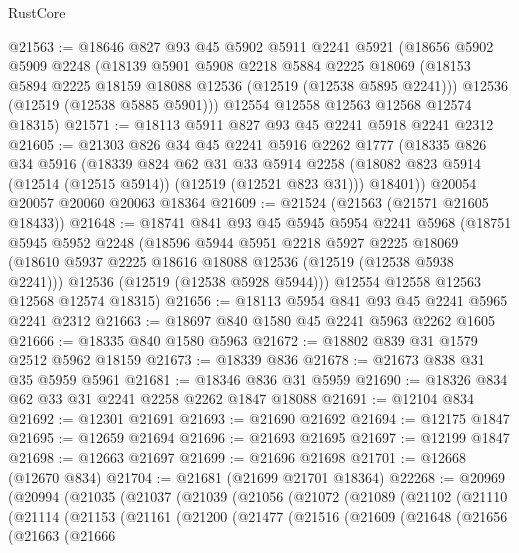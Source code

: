 \begin{lexlean}{RustCore}
\begin{coremodule}
@21563 := @18646
    @827
    @93
    @45
    @5902
    @5911
    @2241
    @5921
    (@18656
      @5902
      @5909
      @2248
      (@18139
        @5901
        @5908
        @2218
        @5884
        @2225
        @18069
        (@18153 @5894 @2225 @18159 @18088 @12536 (@12519 (@12538 @5895 @2241)))
        @12536
        (@12519 (@12538 @5885 @5901)))
      @12554
      @12558
      @12563
      @12568
      @12574
      @18315)
@21571 := @18113 @5911 @827 @93 @45 @2241 @5918 @2241 @2312
@21605 := @21303
    @826
    @34
    @45
    @2241
    @5916
    @2262
    @1777
    (@18335
      @826
      @34
      @5916
      (@18339
        @824
        @62
        @31
        @33
        @5914
        @2258
        (@18082 @823 @5914 (@12514 (@12515 @5914)) (@12519 (@12521 @823 @31)))
        @18401))
    @20054
    @20057
    @20060
    @20063
    @18364
@21609 := @21524 (@21563 (@21571 @21605 @18433))
@21648 := @18741
    @841
    @93
    @45
    @5945
    @5954
    @2241
    @5968
    (@18751
      @5945
      @5952
      @2248
      (@18596
        @5944
        @5951
        @2218
        @5927
        @2225
        @18069
        (@18610 @5937 @2225 @18616 @18088 @12536 (@12519 (@12538 @5938 @2241)))
        @12536
        (@12519 (@12538 @5928 @5944)))
      @12554
      @12558
      @12563
      @12568
      @12574
      @18315)
@21656 := @18113 @5954 @841 @93 @45 @2241 @5965 @2241 @2312
@21663 := @18697 @840 @1580 @45 @2241 @5963 @2262 @1605
@21666 := @18335 @840 @1580 @5963
@21672 := @18802 @839 @31 @1579 @2512 @5962 @18159
@21673 := @18339 @836
@21678 := @21673 @838 @31 @35 @5959 @5961
@21681 := @18346 @836 @31 @5959
@21690 := @18326 @834 @62 @33 @31 @2241 @2258 @2262 @1847 @18088
@21691 := @12104 @834
@21692 := @12301 @21691
@21693 := @21690 @21692
@21694 := @12175 @1847
@21695 := @12659 @21694
@21696 := @21693 @21695
@21697 := @12199 @1847
@21698 := @12663 @21697
@21699 := @21696 @21698
@21701 := @12668 (@12670 @834)
@21704 := @21681 (@21699 @21701 @18364)
@22268 := @20969
    (@20994
      (@21035
        (@21037
          (@21039
            (@21056
              (@21072
                (@21089
                  (@21102
                    (@21110
                      (@21114
                        (@21153
                          (@21161
                            (@21200
                              (@21477
                                (@21516
                                  (@21609
                                    (@21648
                                      (@21656
                                        (@21663
                                          (@21666

\end{coremodule}
\end{lexlean}
